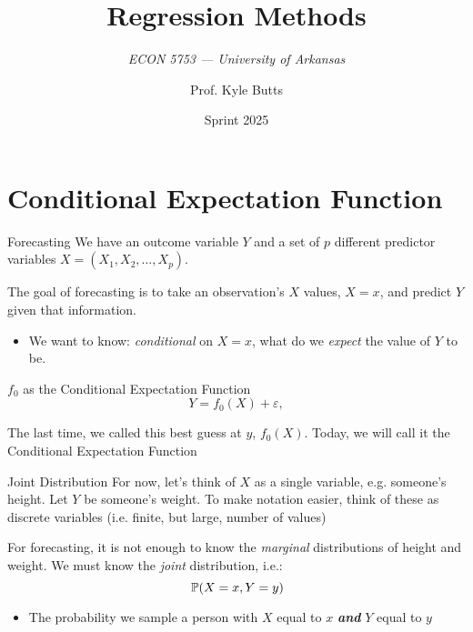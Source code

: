 \documentclass[aspectratio=169,t,11pt,table]{beamer}
\title{Regression Methods}
\subtitle{\it  ECON 5753 — University of Arkansas}
\date{Sprint 2025}
\author{Prof. Kyle Butts}
\begin{document}
\begin{frame}
\maketitle
\end{frame}


\section{Conditional Expectation Function}

\begin{frame}{Forecasting}
  We have an outcome variable $Y$ and a set of $p$ different predictor variables $X = (X_1, X_2, \dots, X_p)$. 

  \bigskip
  The goal of forecasting is to take an observation's $X$ values, $X = x$, and predict $Y$ given that information. 
  \begin{itemize}
    \item We want to know: \emph{conditional} on $X = x$, what do we \emph{expect} the value of $Y$ to be.
  \end{itemize}
\end{frame}

\begin{frame}{$f_0$ as the Conditional Expectation Function}
  \vspace*{-\bigskipamount}
  $$
    Y = f_0(X) + \varepsilon,
  $$
  
  The last time, we called this best guess at $y$, $f_0(X)$. Today, we will call it the \alert{Conditional Expectation Function}
\end{frame}

\begin{frame}{Joint Distribution}
  For now, let's think of $X$ as a single variable, e.g. someone's height. Let $Y$ be someone's weight. To make notation easier, think of these as discrete variables (i.e. finite, but large, number of values)

  \pause
  \bigskip
  For forecasting, it is not enough to know the \emph{marginal} distributions of height and weight. We must know the \emph{joint} distribution, i.e.:
  $$\prob{X = x, Y = y}$$

  \begin{itemize}
    \item The probability we sample a person with $X$ equal to $x$ \emph{\textbf{and}} $Y$ equal to $y$
  \end{itemize}
\end{frame}
\end{document}
